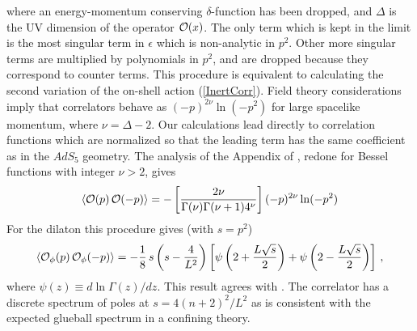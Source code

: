 \documentclass[a4paper,12pt]{article}
\begin{document}
where an energy-momentum conserving $\delta$-function has been dropped,
and $\Delta$ is the UV dimension of the operator ${\cal O}(x)$. The only
term which is kept in the limit is the most singular term in
$\epsilon$ which is non-analytic in $p^2$. Other more singular terms
are multiplied by polynomials in $p^2$, and are dropped because they
correspond to counter terms. This procedure is equivalent to
calculating the second variation of the on-shell action
(\ref{InertCorr}). Field theory considerations imply that correlators
behave as $(-p)^{2\nu} \ln(-p^2)$ for large spacelike momentum, where
$\nu = \Delta - 2$.
Our calculations lead directly to correlation functions
which are normalized so that the leading term has the same coefficient as
in the $AdS_5$ geometry. The analysis of the Appendix of \cite{fmmr}, redone
for Bessel functions with integer $\nu > 2$, gives 
\begin{eqnarray}
\label{pureadscorr}
\langle{\cal O}(p) \, {\cal O} (-p)\rangle = - \left[ \frac{2\nu}{\Gamma(\nu)\Gamma(\nu+1)4^\nu} \right] (-p)^{2\nu} \ln(-p^2)        
\end{eqnarray}
For the dilaton this procedure gives (with $s=p^2$)
\begin{eqnarray}
\langle{\cal O}_{\phi}(p) \, {\cal O}_{\phi}(-p)\rangle = - \frac{1}{8} \,
s \left( s-\frac{4}{L^2} \right) \left[\psi \left( 2 + \frac{L\sqrt{s}}{2} \right) +
\psi \left( 2 - \frac{L \sqrt{s}}{2} \right) \right] \,,
\end{eqnarray}
where $\psi(z) \equiv d\ln \Gamma(z)/dz$. This result agrees with \cite{agpz}.
The
correlator has a discrete spectrum of poles at $s=4(n+2)^2/L^2 $ as is
consistent with the expected glueball spectrum in a confining
theory.
\end{document}
